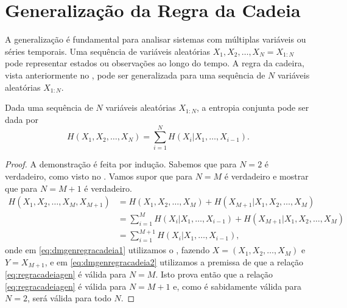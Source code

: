 \section{Generalização da Regra da Cadeia}\label{sec-genchainrule}

A generalização é fundamental para analisar sistemas com múltiplas variáveis ou séries temporais.
Uma sequência de variáveis aleatórias $X_1, X_2, \ldots, X_N = X_{1:N}$ pode representar estados ou observações ao longo do tempo.
A regra da cadeira, vista anteriormente no ,
pode ser generalizada para uma sequência de $N$ variáveis aleatórias $X_{1:N}$.

\begin{proposition}\label{prop:regracadeiagen}
Dada uma sequência de $N$ variáveis aleatórias $X_{1:N}$, a entropia conjunta pode ser dada por 
\begin{equation}\label{eq:regracadeiagen}
H(X_1, X_2, \ldots, X_N) = \sum_{i=1}^{N} H(X_i|X_1, \ldots, X_{i-1}) .
\end{equation}
\end{proposition}
\begin{proof}
A demonstração é feita por indução. Sabemos que para $N=2$ é verdadeiro, como visto no .
Vamos supor que para $N=M$ é verdadeiro e mostrar que para $N=M+1$ é verdadeiro.
\begin{subequations}\label{eq:dmgenregracadeia}
\begin{align}
    H(X_1, X_2, \ldots, X_M, X_{M+1}) &= H(X_1, X_2, \ldots, X_M) + H(X_{M+1} | X_1, X_2, \ldots, X_M) \label{eq:dmgenregracadeia1}\\
				      &= \sum_{i=1}^{M} H(X_i|X_1, \ldots, X_{i-1}) + H(X_{M+1} | X_1, X_2, \ldots, X_M) \label{eq:dmgenregracadeia2}\\
 &= \sum_{i=1}^{M+1} H(X_i|X_1, \ldots, X_{i-1}) ,
\end{align}
\end{subequations}
onde em \ref{eq:dmgenregracadeia1} utilizamos o , fazendo $X=(X_1, X_2, \ldots, X_M)$ e $Y=X_{M+1}$,
e em \ref{eq:dmgenregracadeia2} utilizamos a premissa de que a relação \ref{eq:regracadeiagen} é válida para $N=M$.
Isto prova então que a relação \ref{eq:regracadeiagen} é válida para $N=M+1$ e, como é sabidamente válida para $N=2$,
será válida para todo $N$.
\end{proof}


